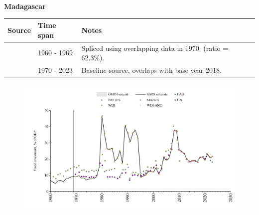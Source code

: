 \documentclass[12pt,a4paper,landscape]{article}
\begin{document}
\begin{adjustbox}{max totalsize={\paperwidth}{\paperheight},center}
\begin{minipage}[t][\textheight][t]{\textwidth}
\vspace*{0.5cm}
{}
\begin{center}
{\Large\bfseries Madagascar}
\end{center}
\vspace{0.5cm}
\begin{table}[H]
\centering
\small
\begin{tabular}{|l|l|l|}
\hline
\textbf{Source} & \textbf{Time span} & \textbf{Notes} \\
\hline
\rowcolor{white}\cite{Mitchell}& 1960 - 1969 &Spliced using overlapping data in 1970: (ratio = 62.3\%).\\
\rowcolor{lightgray}\cite{WDI}& 1970 - 2023 &Baseline source, overlaps with base year 2018.\\
\hline
\end{tabular}
\end{table}
\begin{figure}[H]
\centering
\includegraphics[width=\textwidth,height=0.6\textheight,keepaspectratio]{graphs/MDG_finv_GDP.pdf}
\end{figure}
\end{minipage}
\end{adjustbox}
\end{document}
